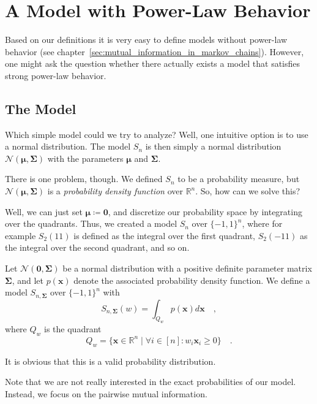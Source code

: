 \documentclass[../../main.tex]{subfiles}
\begin{document}
\section{A Model with Power-Law Behavior}
Based on our definitions it is very easy to define models without power-law behavior (see chapter~\ref{sec:mutual_information_in_markov_chains}). However, one might ask the question whether there actually exists a model that satisfies strong power-law behavior.

\subsection{The Model}
Which simple model could we try to analyze? Well, one intuitive option is to use a normal distribution. The model $S_n$ is then simply a normal distribution $\mathcal{N}(\bm{\mu}, \bm{\Sigma})$ with the parameters $\bm{\mu}$ and $\bm{\Sigma}$.

There is one problem, though. We defined $S_n$ to be a probability measure, but $\mathcal{N}(\bm{\mu}, \bm{\Sigma})$ is a \emph{probability density function} over $\mathbb{R}^n$. So, how can we solve this?

Well, we can just set $\bm{\mu} \coloneqq \bm{0}$, and discretize our probability space by integrating over the quadrants. Thus, we created a model $S_n$ over $\{-1, 1\}^n$, where for example $S_2(11)$ is defined as the integral over the first quadrant, $S_2(-11)$ as the integral over the second quadrant, and so on.

\begin{definition}
    Let $\mathcal{N}(\bm{0}, \bm{\Sigma})$ be a normal distribution with a positive definite parameter matrix $\bm{\Sigma}$, and let $p(\bm{x})$ denote the associated probability density function. We define a model $S_{n, \bm{\Sigma}}$ over $\{-1, 1\}^n$ with
    \[
        S_{n, \bm{\Sigma}}(w) = \int_{Q_w} p(\bm{x}) d\bm{x} \quad ,
    \]
    where $Q_w$ is the quadrant
    \[
        Q_w = \{ \bm{x} \in \mathbb{R}^n \mid \forall i \in [n] : w_i \bm{x}_i \geq 0 \} \quad .
    \]
\end{definition}

\begin{remark}
    It is obvious that this is a valid probability distribution.
\end{remark}

Note that we are not really interested in the exact probabilities of our model. Instead, we focus on the pairwise mutual information.
\end{document}
